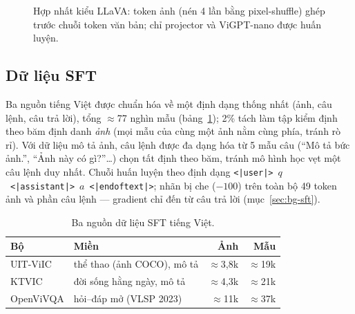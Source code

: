 \begin{figure}[H]
	\centering
	\caption{Hợp nhất kiểu LLaVA: token ảnh (nén 4 lần bằng pixel-shuffle)
	ghép trước chuỗi token văn bản; chỉ projector và ViGPT-nano được huấn luyện.}
	\label{fig:fusion}
\end{figure}

\subsection{Dữ liệu SFT}

Ba nguồn tiếng Việt được chuẩn hóa về một định dạng thống nhất
(ảnh, câu lệnh, câu trả lời), tổng $\approx$77 nghìn mẫu
(bảng~\ref{tab:sft-data}); 2\% tách làm tập kiểm định theo băm định danh
\emph{ảnh} (mọi mẫu của cùng một ảnh nằm cùng phía, tránh rò rỉ). Với dữ liệu
mô tả ảnh, câu lệnh được đa dạng hóa từ 5 mẫu câu (``Mô tả bức ảnh.'', ``Ảnh
này có gì?''\ldots) chọn tất định theo băm, tránh mô hình học vẹt một câu lệnh
duy nhất. Chuỗi huấn luyện theo định dạng
\texttt{<|user|>}~$q$~\texttt{<|assistant|>}~$a$~\texttt{<|endoftext|>}; nhãn
bị che ($-100$) trên toàn bộ 49 token ảnh và phần câu lệnh --- gradient chỉ
đến từ câu trả lời (mục~\ref{sec:bg-sft}).

\begin{table}[H]
	\centering
	\caption{Ba nguồn dữ liệu SFT tiếng Việt.}
	\label{tab:sft-data}
	\begin{tabularx}{\textwidth}{lXrr}
		\hline
		\textbf{Bộ} & \textbf{Miền} & \textbf{Ảnh} & \textbf{Mẫu} \\
		\hline
		UIT-ViIC \autocite{lam2020viic} & thể thao (ảnh COCO), mô tả & $\approx$3,8k & $\approx$19k \\
		KTVIC \autocite{pham2024ktvic} & đời sống hằng ngày, mô tả & $\approx$4,3k & $\approx$21k \\
		OpenViVQA \autocite{nguyen2023openvivqa} & hỏi--đáp mở (VLSP 2023) & $\approx$11k & $\approx$37k \\
		\hline
	\end{tabularx}
\end{table}

